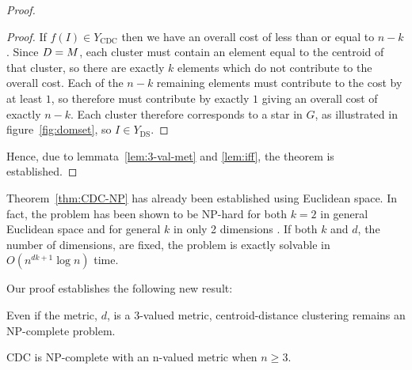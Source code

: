 \begin{proof}
\begin{proof}
    If $f(I) \in Y_{\text{CDC}}$ then we have an overall cost of less than or
    equal to $n-k$.  Since $D = M$, each cluster must contain an element
    equal to the centroid of that cluster, so there are exactly $k$ elements
    which do not contribute to the overall cost.  Each of the $n-k$ remaining
    elements must contribute to the cost by at least $1$, so therefore must
    contribute by exactly $1$ giving an overall cost of exactly $n-k$.  Each
    cluster therefore corresponds to a star in $G$, as illustrated in
    figure~\ref{fig:domset}, so $I \in Y_{\text{DS}}$.
  \end{proof}

  Hence, due to lemmata~\ref{lem:3-val-met} and \ref{lem:iff}, the theorem is
  established.
\end{proof}

Theorem~\ref{thm:CDC-NP} has already been established using Euclidean space.
In fact, the problem has been shown to be NP-hard for both $k=2$ in general
Euclidean space \citep{aloise09} and for general $k$ in only 2 dimensions
\citep{mahajan09}.  If both $k$ and $d$, the number of dimensions, are fixed,
the problem is exactly solvable in $O(n^{dk+1} \log n)$
time\citep{inaba94weightedvoronoi}.

Our proof establishes the following new result:
\begin{cor}
  Even if the metric, $d$, is a 3-valued metric, centroid-distance clustering
  remains an NP-complete problem.
\end{cor}

\begin{thm}
  \label{thm:cdc-np-complete-n-val}
  CDC is NP-complete with an n-valued metric when $n \geq 3$.
\end{thm}


